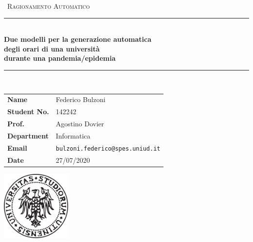 \documentclass[12pt, italian, openany]{book}
\begin{document}

\begin{titlepage}
	\clearpage\thispagestyle{empty}
	\centering
	\vspace{1cm}

	{\
		\textsc{Ragionamento Automatico}
	}
		\vspace{2.5cm}
		
	\rule{\linewidth}{2mm} \\[0.5cm]
	{ \Huge \bfseries Due modelli per la generazione automatica\\[0.2em]
		degli orari di una università\\[0.2em]
		durante una pandemia/epidemia}\\[0.5cm]
	\rule{\linewidth}{0.6mm} \\[3.4cm]

	\hspace{2cm}
		\begin{tabular}{l p{5cm}}
		\textbf{Name} & Federico Bulzoni \\[10pt]
		\textbf{Student No.} & 142242 \\[10pt]
		\textbf{Prof.} & Agostino Dovier \\[10pt]
		\textbf{Department} & Informatica \\[10pt]
		\textbf{Email} & \texttt{bulzoni.federico@spes.uniud.it} \\[10pt]
		\textbf{Date} &  27/07/2020\\            
		\end{tabular}
   
    
    \vfill
    \centering \includegraphics[height=3.5cm]{logo_uniud}\\ %
    \vspace{0.5cm}

		
	
	
	\pagebreak

\end{titlepage}
\end{document}
